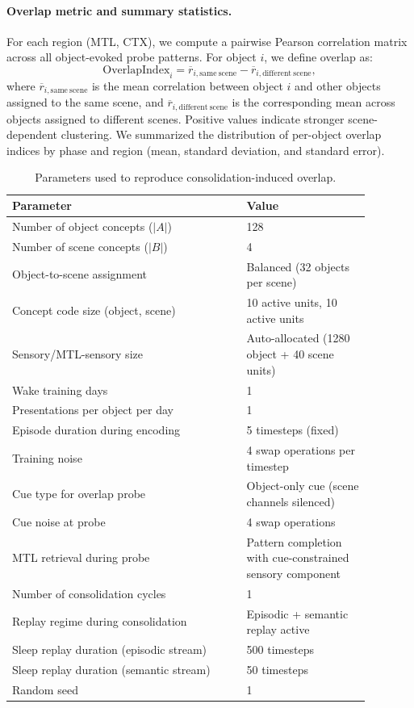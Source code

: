 \documentclass{article}
\begin{document}
\paragraph{Overlap metric and summary statistics.}
For each region (MTL, CTX), we compute a pairwise Pearson correlation matrix across all object-evoked probe patterns. For object $i$, we define overlap as:
\begin{equation}
\mathrm{OverlapIndex}_i
=
\overline{r}_{i,\mathrm{same\ scene}}
-
\overline{r}_{i,\mathrm{different\ scene}},
\end{equation}
where $\overline{r}_{i,\mathrm{same\ scene}}$ is the mean correlation between object $i$ and other objects assigned to the same scene, and $\overline{r}_{i,\mathrm{different\ scene}}$ is the corresponding mean across objects assigned to different scenes. Positive values indicate stronger scene-dependent clustering. We summarized the distribution of per-object overlap indices by phase and region (mean, standard deviation, and standard error).
\begin{table}[ht]
\centering
\caption{Parameters used to reproduce consolidation-induced overlap.}
\label{tab:overlap_reproduction_parameters}
\begin{tabular}{p{0.58\linewidth}p{0.30\linewidth}}
\toprule
\textbf{Parameter} & \textbf{Value} \\
\midrule
Number of object concepts ($|A|$) & 128 \\
Number of scene concepts ($|B|$) & 4 \\
Object-to-scene assignment & Balanced (32 objects per scene) \\
Concept code size (object, scene) & 10 active units, 10 active units \\
Sensory/MTL-sensory size & Auto-allocated (1280 object + 40 scene units) \\
Wake training days & 1 \\
Presentations per object per day & 1 \\
Episode duration during encoding & 5 timesteps (fixed) \\
Training noise & 4 swap operations per timestep \\
Cue type for overlap probe & Object-only cue (scene channels silenced) \\
Cue noise at probe & 4 swap operations \\
MTL retrieval during probe & Pattern completion with cue-constrained sensory component \\
Number of consolidation cycles & 1 \\
Replay regime during consolidation & Episodic + semantic replay active \\
Sleep replay duration (episodic stream) & 500 timesteps \\
Sleep replay duration (semantic stream) & 50 timesteps \\
Random seed & 1 \\
\bottomrule
\end{tabular}
\end{table}
\end{document}
